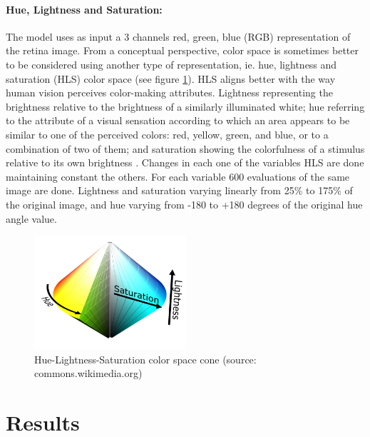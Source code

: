 \paragraph{Hue, Lightness and Saturation:} The model uses as input a 3 channels red, green, blue (RGB) representation of the retina image. From a conceptual perspective, color space is sometimes better to be considered using another type of representation, ie. hue, lightness and saturation (HLS) color space (see figure \ref{sta:fig:hsl}). HLS aligns better with the way human vision perceives color-making attributes. Lightness representing the brightness relative to the brightness of a similarly illuminated white; hue referring to the attribute of a visual sensation according to which an area appears to be similar to one of the perceived colors: red, yellow, green, and blue, or to a combination of two of them; and saturation showing the colorfulness of a stimulus relative to its own brightness \citep{fairchild2013color}. Changes in each one of the variables HLS are done maintaining constant the others. For each variable 600 evaluations of the same image are done. Lightness and saturation varying linearly from 25\% to 175\% of the original image, and hue varying from -180 to +180 degrees of the original hue angle value. 

\begin{figure}[ht!]
	\centering
	\includegraphics[width=0.5\textwidth]{Figures/chapter_stability/HSL_color_solid_dblcone.png}
	\caption[Hue-Lightness-Saturation color space cone]{Hue-Lightness-Saturation color space cone (source: commons.wikimedia.org)}
	\label{sta:fig:hsl}
\end{figure}


\section{Results}

